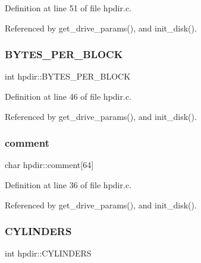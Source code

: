 Definition at line 51 of file hpdir.\+c.



Referenced by get\+\_\+drive\+\_\+params(), and init\+\_\+disk().

\mbox{\label{structhpdir_a39c4462a29e33bb7c8712c3a4e4a2356}} 
\subsubsection{\texorpdfstring{B\+Y\+T\+E\+S\+\_\+\+P\+E\+R\+\_\+\+B\+L\+O\+CK}{BYTES\_PER\_BLOCK}}
{\footnotesize\ttfamily int hpdir\+::\+B\+Y\+T\+E\+S\+\_\+\+P\+E\+R\+\_\+\+B\+L\+O\+CK}



Definition at line 46 of file hpdir.\+c.



Referenced by get\+\_\+drive\+\_\+params(), and init\+\_\+disk().

\mbox{\label{structhpdir_a574c1602e6f78692be2ca81d26128e70}} 
\subsubsection{\texorpdfstring{comment}{comment}}
{\footnotesize\ttfamily char hpdir\+::comment\mbox{[}64\mbox{]}}



Definition at line 36 of file hpdir.\+c.



Referenced by get\+\_\+drive\+\_\+params(), and init\+\_\+disk().

\mbox{\label{structhpdir_a9d9c55a2ea7b79f47eb319c58e603f7f}} 
\subsubsection{\texorpdfstring{C\+Y\+L\+I\+N\+D\+E\+RS}{CYLINDERS}}
{\footnotesize\ttfamily int hpdir\+::\+C\+Y\+L\+I\+N\+D\+E\+RS}



